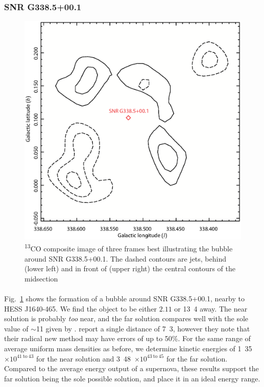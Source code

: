 \documentclass[a4paper, titlepage, oneside]{article}
\newcommand{\elem}[2]{\textsuperscript{#1}{#2}}
\newcommand{\e}[1]{\ensuremath{\times 10^{#1}}}
\newcommand{\parsec}{\mathrm{pc}}
\begin{document}
\begin{multicols}{2}
\subsubsection{SNR G338.5+00.1}

\begin{figure}[H]
  \centering
  \includegraphics[width = \columnwidth]{figures/bubble40}
  \caption{\elem{13}{C}O composite image of three frames best illustrating the bubble around SNR G338.5+00.1. The dashed contours are jets, behind (lower left) and in front of (upper right) the central contours of the midsection}
  \label{fig:bubble40}
\end{figure}

\paragraph{}
Fig.~\ref{fig:bubble40} shows the formation of a bubble around SNR G338.5+00.1, nearby to HESS J1640-465. We find the object to be either \(2.11\) or \unit{13.4}{\kilo\parsec} away. The near solution is probably \textit{too} near, and the far solution compares well with the sole value of \(\sim\)\unit{11}{\kilo\parsec} given by \textcite{Kothes:2007}. \textcite{Pavlovic:2013} report a single distance of \unit{7.3}{\kilo\parsec}, however they note that their radical new method may have errors of up to 50\%. For the same range of average uniform mass densities as before, we determine kinetic energies of \unit{1.35\e{41 \mathrm{~to~} 43}}{\joule} for the near solution and \unit{3.48\e{43 \mathrm{~to~} 45}}{\joule} for the far solution. Compared to the average energy output of a supernova, these results support the far solution being the sole possible solution, and place it in an ideal energy range.


\end{multicols}
\end{document}
